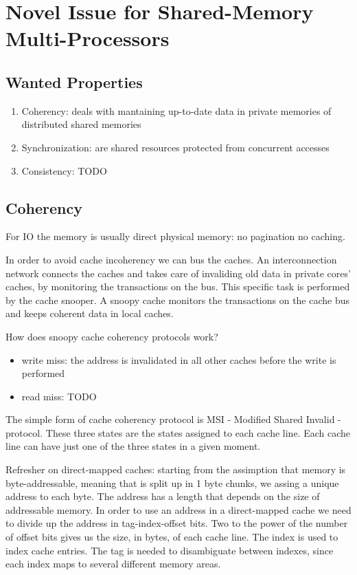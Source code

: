 \chapter{Novel Issue for Shared-Memory Multi-Processors}
\section{Wanted Properties}
\begin{enumerate}
  \item Coherency: deals with mantaining up-to-date data in private memories of distributed shared memories
  \item Synchronization: are shared resources protected from concurrent accesses
  \item Consistency: TODO
\end{enumerate}

\section{Coherency}
For IO the memory is usually direct physical memory: no pagination no caching.

In order to avoid cache incoherency we can bus the caches.
An interconnection network connects the caches and takes care of invaliding old data in private cores' caches, by monitoring the transactions on the bus.
This specific task is performed by the cache snooper. A snoopy cache monitors the transactions on the cache bus and keeps coherent data in local caches.

How does snoopy cache coherency protocols work?

\begin{itemize}
  \item write miss: the address is invalidated in all other caches before the write is performed
  \item read miss: TODO
\end{itemize}

The simple form of cache coherency protocol is MSI - Modified Shared Invalid - protocol.
These three states are the states assigned to each cache line. Each cache line can have just one of the three states in a given moment.

Refresher on direct-mapped caches: starting from the assimption that memory is byte-addressable, meaning that is split up in 1 byte chunks, we assing a unique address to each byte.
The address has a length that depends on the size of addressable memory. In order to use an address in a direct-mapped cache we need to divide up the address in tag-index-offset bits.
Two to the power of the number of offset bits gives us the size, in bytes, of each cache line.
The index is used to index cache entries.
The tag is needed to disambiguate between indexes, since each index maps to several different memory areas.


